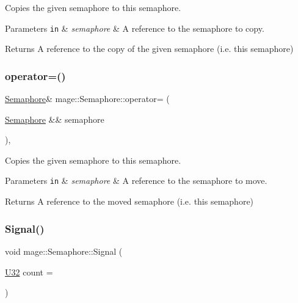 Copies the given semaphore to this semaphore.


\begin{DoxyParams}[1]{Parameters}
\mbox{\tt in}  & {\em semaphore} & A reference to the semaphore to copy. \\
\hline
\end{DoxyParams}
\begin{DoxyReturn}{Returns}
A reference to the copy of the given semaphore (i.\+e. this semaphore) 
\end{DoxyReturn}
\hypertarget{classmage_1_1_semaphore_ab55e257e8796f441b26eb67edcd4c52d}{}\label{classmage_1_1_semaphore_ab55e257e8796f441b26eb67edcd4c52d} 
\subsubsection{\texorpdfstring{operator=()}{operator=()}\hspace{0.1cm}{\footnotesize\ttfamily [2/2]}}
{\footnotesize\ttfamily \hyperlink{classmage_1_1_semaphore}{Semaphore}\& mage\+::\+Semaphore\+::operator= (\begin{DoxyParamCaption}\item[{\hyperlink{classmage_1_1_semaphore}{Semaphore} \&\&}]{semaphore }\end{DoxyParamCaption})\hspace{0.3cm}{\ttfamily [default]}, {\ttfamily [noexcept]}}

Copies the given semaphore to this semaphore.


\begin{DoxyParams}[1]{Parameters}
\mbox{\tt in}  & {\em semaphore} & A reference to the semaphore to move. \\
\hline
\end{DoxyParams}
\begin{DoxyReturn}{Returns}
A reference to the moved semaphore (i.\+e. this semaphore) 
\end{DoxyReturn}
\hypertarget{classmage_1_1_semaphore_a0b7948e009f0fbdad2b2dc5e9fc420d7}{}\label{classmage_1_1_semaphore_a0b7948e009f0fbdad2b2dc5e9fc420d7} 
\subsubsection{\texorpdfstring{Signal()}{Signal()}}
{\footnotesize\ttfamily void mage\+::\+Semaphore\+::\+Signal (\begin{DoxyParamCaption}\item[{\hyperlink{namespacemage_a41c104c036fba3756a74e19f793eeaa1}{U32}}]{count = {} }\end{DoxyParamCaption})\hspace{0.3cm}{\ttfamily [noexcept]}}

